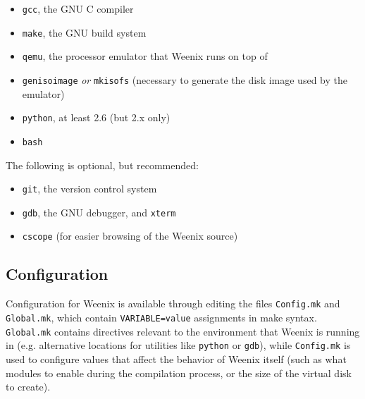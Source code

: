 \begin{itemize}
\item \texttt{gcc}, the GNU C compiler %
\item \texttt{make}, the GNU build system
\item \texttt{qemu},%
the processor emulator that Weenix runs on top of
\item \texttt{genisoimage} \textit{or} \texttt{mkisofs} (necessary to generate the disk image used by the emulator)
\item \texttt{python}, at least 2.6 (but 2.x only)
\item \texttt{bash}
\end{itemize}

The following is optional, but recommended:
\begin{itemize}
\item \texttt{git}, the version control system
\item \texttt{gdb}, the GNU debugger, and \texttt{xterm} %
\item \texttt{cscope} (for easier browsing of the Weenix source)
\end{itemize}


\subsection{Configuration}
Configuration for Weenix is available through editing the files \texttt{Config.mk} and \texttt{Global.mk}, which contain \texttt{VARIABLE=value} assignments in make syntax.  \texttt{Global.mk} contains directives relevant to the environment that Weenix is running in (e.g. alternative locations for utilities like \texttt{python} or \texttt{gdb}), while \texttt{Config.mk} is used to configure values that affect the behavior of Weenix itself (such as what modules to enable during the compilation process, or the size of the virtual disk to create).

